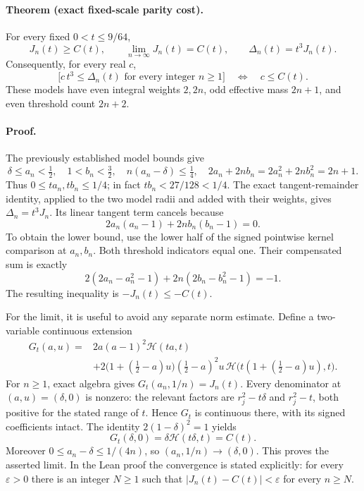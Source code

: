 \paragraph{Theorem (exact fixed-scale parity cost).}
For every fixed \(0<t\le9/64\),
\[
 J_n(t)\ge C(t),\qquad
 \lim_{n\to\infty}J_n(t)=C(t),\qquad
 \Delta_n(t)=t^3J_n(t).
\]
Consequently, for every real \(c\),
\[
 \bigl[c\,t^3\le\Delta_n(t)\text{ for every integer }n\ge1\bigr]
 \quad\Longleftrightarrow\quad c\le C(t).
\]
These models have even integral weights \(2,2n\), odd effective mass
\(2n+1\), and even threshold count \(2n+2\).

\paragraph{Proof.}
The previously established model bounds give
\[
 \delta\le a_n<\tfrac12,\quad
 1<b_n<\tfrac32,\quad
 n(a_n-\delta)\le\tfrac14,\quad
 2a_n+2nb_n=2a_n^2+2nb_n^2=2n+1.
\]
Thus \(0\le ta_n,tb_n\le1/4\); in fact
\(tb_n<27/128<1/4\).  The exact tangent-remainder identity,
applied to the two model radii and added with their weights, gives
\(\Delta_n=t^3J_n\).  Its linear tangent term cancels because
\[
 2a_n(a_n-1)+2nb_n(b_n-1)=0.
\]
To obtain the lower bound, use the lower half of the signed
pointwise kernel comparison at \(a_n,b_n\).  Both threshold
indicators equal one.  Their compensated sum is exactly
\[
 2(2a_n-a_n^2-1)+2n(2b_n-b_n^2-1)=-1.
\]
The resulting inequality is \(-J_n(t)\le-C(t)\).

For the limit, it is useful to avoid any separate norm estimate.
Define a two-variable continuous extension
\[
 \begin{split}
 G_t(a,u)={}&2a(a-1)^2\mathcal H(ta,t)\\
 &+2\bigl(1+(\tfrac12-a)u\bigr)(\tfrac12-a)^2u\,
 \mathcal H\bigl(t(1+(\tfrac12-a)u),t\bigr).
 \end{split}
\]
For \(n\ge1\), exact algebra gives \(G_t(a_n,1/n)=J_n(t)\).
Every denominator at \((a,u)=(\delta,0)\) is nonzero:
the relevant factors are \(r_j^2-t\delta\) and \(r_j^2-t\),
both positive for the stated range of \(t\).
Hence \(G_t\) is continuous there, with its signed coefficients intact.
The identity \(2(1-\delta)^2=1\) yields
\[
 G_t(\delta,0)=\delta\mathcal H(t\delta,t)=C(t).
\]
Moreover \(0\le a_n-\delta\le1/(4n)\), so
\((a_n,1/n)\to(\delta,0)\).  This proves the asserted limit.
In the Lean proof the convergence is stated explicitly: for every
\(\varepsilon>0\) there is an integer \(N\ge1\) such that
\(|J_n(t)-C(t)|<\varepsilon\) for every \(n\ge N\).

